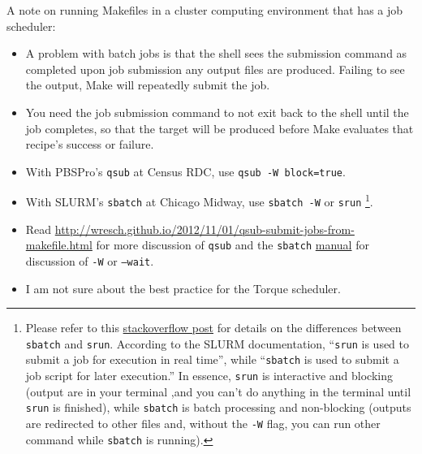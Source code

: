 A note on running Makefiles in a cluster computing environment that has a job scheduler:
\begin{itemize}
	\item A problem with batch jobs is that the shell sees the submission command as completed upon job submission any output files are produced.
	Failing to see the output, Make will repeatedly submit the job.
	\item You need the job submission command to not exit back to the shell until the job completes, so that the target will be produced before Make evaluates that recipe's success or failure.
	\item With PBSPro's \texttt{qsub} at Census RDC, use \texttt{qsub -W block=true}.
	\item With SLURM's \texttt{sbatch} at Chicago Midway, use \texttt{sbatch -W} or \texttt{srun}%
		\footnote{
			Please refer to this \href{https://stackoverflow.com/questions/43767866/slurm-srun-vs-sbatch-and-their-parameters}{stackoverflow post}
				for details on the differences
				between \texttt{sbatch} and \texttt{srun}.
			According to the SLURM documentation,
				``\texttt{srun} is used to submit a job for execution in real time'',
				while ``\texttt{sbatch} is used to submit a job script for later execution.''
			In essence, \texttt{srun} is interactive and blocking
				(output are in your terminal ,and
				you can't do anything in the terminal until \texttt{srun} is finished),
				while \texttt{sbatch} is batch processing and non-blocking
				(outputs are redirected to other files and,
				without the \texttt{-W} flag,
				you can run other command while \texttt{sbatch} is running).
		}.
	\item Read \url{http://wresch.github.io/2012/11/01/qsub-submit-jobs-from-makefile.html} for more discussion of \texttt{qsub} and the \texttt{sbatch} \href{https://slurm.schedmd.com/sbatch.html}{manual} for discussion of \texttt{-W} or \texttt{--wait}.
	\item I am not sure about the best practice for the Torque scheduler.
\end{itemize}
